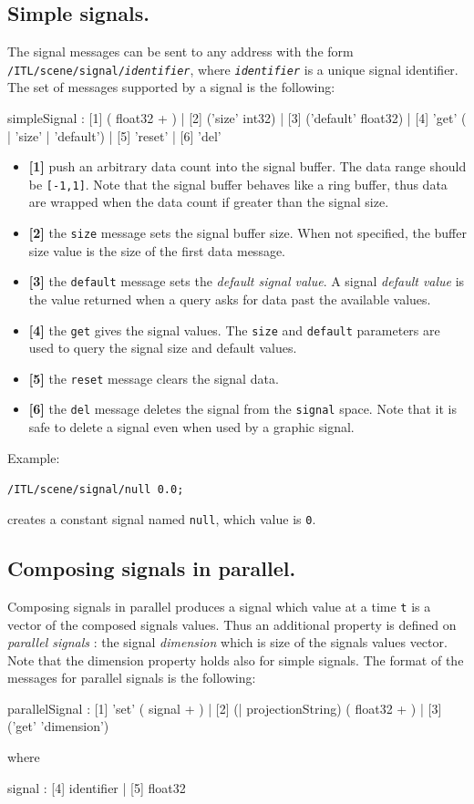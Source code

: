 \documentclass[a4paper,twoside]{report}
\newcommand{\subsublevel}[1]	{\subsection{#1}}
\newcommand{\OSC}[1]		{\texttt{#1}}
\newcommand{\values}[1]	{\texttt{#1}}
\newcommand{\sample}	[1]			{\begin{center}\colorbox{mygrey}{
								\begin{minipage}[t]{0.9\columnwidth} 
								{\small \texttt{#1}}
								\end{minipage}}\end{center}}
\begin{document}
\subsublevel{Simple signals.}
\label{ssignal}
The signal messages can be sent to any address with the form \OSC{/ITL/scene/signal/\textit{identifier}}, where \OSC{\textit{identifier}} is a unique signal identifier.
The set of messages supported by a signal is the following:
\begin{rail}
simpleSignal : [1] ( float32 + )
		| [2] ('size' int32) 
		| [3] ('default' float32)
		| [4] 'get' ( | 'size' | 'default')
		| [5] 'reset'
		| [6] 'del'
\end{rail}

\begin{itemize}
\item \textbf{[1]} push an arbitrary data count into the signal buffer. The data range should be \values{[-1,1]}. Note that the signal buffer behaves like a ring buffer, thus data are wrapped when the data count if greater than the signal size. 
\item \textbf{[2]} the \OSC{size} message sets the signal buffer size. When not specified, the buffer size value is the size of the first data message. 
\item \textbf{[3]} the \OSC{default} message sets the \emph{default signal value}. A signal \emph{default value} is the value returned when a query asks for data past the available values.
\item \textbf{[4]} the \OSC{get} gives the signal values. The \OSC{size} and  \OSC{default} parameters are used to query the signal size and default values.
\item \textbf{[5]} the \OSC{reset} message clears the signal data. 
\item \textbf{[6]} the \OSC{del} message deletes the signal from the \OSC{signal} space. Note that it is safe to delete a signal even when used by a graphic signal. 
\end{itemize}

Example:
\sample{/ITL/scene/signal/null 0.0;}
creates a constant signal named \OSC{null}, which value is \values{0}.

\subsublevel{Composing signals in parallel.}\label{parcomp}
Composing signals in parallel produces a signal which value at a time \values{t} is a vector of the composed signals values. Thus an additional property is defined on \emph{parallel signals} : the signal \emph{dimension} which is size of the signals values vector. Note that the dimension property holds also for simple signals.
The format of the messages for parallel signals is the following:
\begin{rail}
parallelSignal :  
		  [1] 'set' ( signal + )
		| [2] (| projectionString) ( float32 + )
		| [3] ('get' 'dimension') 
\end{rail}
where 
\begin{rail}
signal :  
		  [4] identifier
		| [5] float32
\end{rail}
\end{document}
